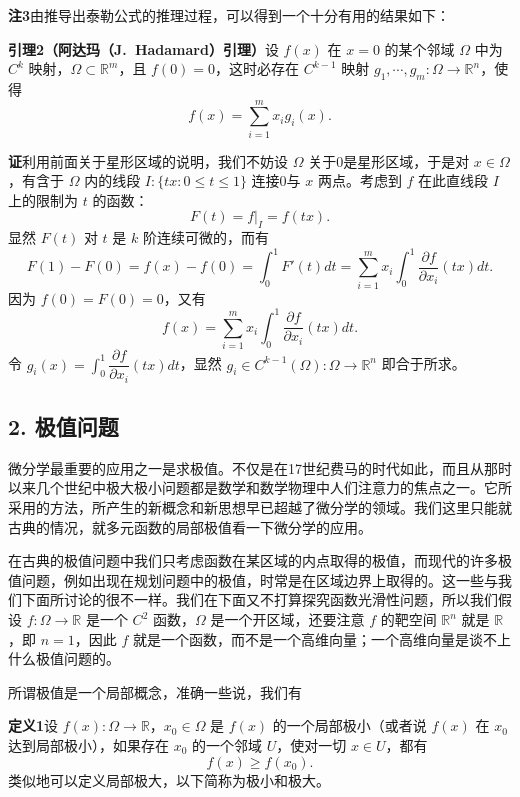 \noindent\textbf{注3}\quad 由推导出泰勒公式的推理过程，可以得到一个十分有用的结果如下：

\noindent\textbf{引理2（阿达玛（J.~Hadamard）引理）}\quad 设 $f(x)$ 在 $x=0$ 的某个邻域 $\Omega$ 中为 $C^k$ 映射，$\Omega\subset\mathbb R^m$，且 $f(0)=0$，这时必存在 $C^{k-1}$ 映射 $g_1,\cdots,g_m:\Omega\to\mathbb R^n$，使得
\begin{equation}
 f(x)=\sum_{i=1}^m x_i g_i(x).
 \tag{14}
\end{equation}

\noindent\textbf{证}\quad 利用前面关于星形区域的说明，我们不妨设 $\Omega$ 关于0是星形区域，于是对 $x\in\Omega$，有含于 $\Omega$ 内的线段 $I:\{tx:0\le t\le1\}$ 连接0与 $x$ 两点。考虑到 $f$ 在此直线段 $I$ 上的限制为 $t$ 的函数：
\[
 F(t)=f\big|_I=f(tx).
\]
显然 $F(t)$ 对 $t$ 是 $k$ 阶连续可微的，而有
\[
 F(1)-F(0)=f(x)-f(0)=\int_0^1F'(t)dt
 =\sum_{i=1}^m x_i\int_0^1\frac{\partial f}{\partial x_i}(tx)dt.
\]
因为 $f(0)=F(0)=0$，又有
\[
 f(x)=\sum_{i=1}^m x_i\int_0^1\frac{\partial f}{\partial x_i}(tx)dt.
\]
令 $g_i(x)=\int_0^1\dfrac{\partial f}{\partial x_i}(tx)dt$，显然 $g_i\in C^{k-1}(\Omega):\Omega\to\mathbb R^n$ 即合于所求。

\subsection*{2. 极值问题}

微分学最重要的应用之一是求极值。不仅是在17世纪费马的时代如此，而且从那时以来几个世纪中极大极小问题都是数学和数学物理中人们注意力的焦点之一。它所采用的方法，所产生的新概念和新思想早已超越了微分学的领域。我们这里只能就古典的情况，就多元函数的局部极值看一下微分学的应用。

在古典的极值问题中我们只考虑函数在某区域的内点取得的极值，而现代的许多极值问题，例如出现在规划问题中的极值，时常是在区域边界上取得的。这一些与我们下面所讨论的很不一样。我们在下面又不打算探究函数光滑性问题，所以我们假设 $f:\Omega\to\mathbb R$ 是一个 $C^2$ 函数，$\Omega$ 是一个开区域，还要注意 $f$ 的靶空间 $\mathbb R^n$ 就是 $\mathbb R$，即 $n=1$，因此 $f$ 就是一个函数，而不是一个高维向量；一个高维向量是谈不上什么极值问题的。

所谓极值是一个局部概念，准确一些说，我们有

\noindent\textbf{定义1}\quad 设 $f(x):\Omega\to\mathbb R$，$x_0\in\Omega$ 是 $f(x)$ 的一个局部极小（或者说 $f(x)$ 在 $x_0$ 达到局部极小），如果存在 $x_0$ 的一个邻域 $U$，使对一切 $x\in U$，都有
\[
 f(x)\ge f(x_0).
\]
类似地可以定义局部极大，以下简称为极小和极大。

